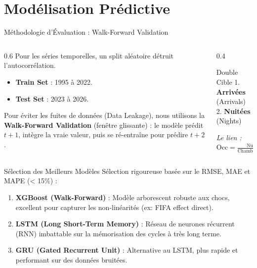 \documentclass[aspectratio=169]{beamer}
\begin{document}
\section{Modélisation Prédictive}
\begin{frame}{Méthodologie d'Évaluation : Walk-Forward Validation}
    \begin{columns}
        \begin{column}{0.6\textwidth}
            Pour les séries temporelles, un split aléatoire détruit l'autocorrélation. 
            \vspace{0.2cm}
            \begin{itemize}
                \item \textbf{Train Set} : 1995 à 2022.
                \item \textbf{Test Set} : 2023 à 2026.
            \end{itemize}
            \vspace{0.2cm}
            Pour éviter les fuites de données (Data Leakage), nous utilisons la \textbf{Walk-Forward Validation} (fenêtre glissante) : le modèle prédit $t+1$, intègre la vraie valeur, puis se ré-entraîne pour prédire $t+2$.
        \end{column}
        \begin{column}{0.4\textwidth}
            \begin{block}{Double Cible}
                1. \textbf{Arrivées} (Arrivals) \\
                2. \textbf{Nuitées} (Nights)
            \end{block}
            \textit{Le lien :} \\
            $\text{Occ} = \frac{\text{Nuitées}}{\text{Chambres} \times 365}$
        \end{column}
    \end{columns}
\end{frame}

\begin{frame}{Sélection des Meilleurs Modèles}
    Sélection rigoureuse basée sur le RMSE, MAE et MAPE (< 15\%) :
    \vspace{0.3cm}
    \begin{enumerate}
        \item \textbf{XGBoost (Walk-Forward)} : Modèle arborescent robuste aux chocs, excellent pour capturer les non-linéarités (ex: FIFA effect direct).
        \item \textbf{LSTM (Long Short-Term Memory)} : Réseau de neurones récurrent (RNN) imbattable sur la mémorisation des cycles à très long terme.
        \item \textbf{GRU (Gated Recurrent Unit)} : Alternative au LSTM, plus rapide et performant sur des données bruitées.
    \end{enumerate}
\end{frame}
\end{document}
